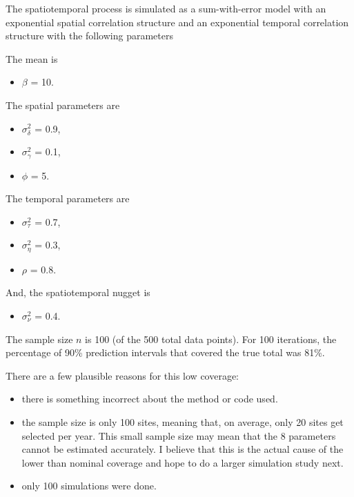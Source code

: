 \documentclass[]{interact}
\theoremstyle{plain}%
\theoremstyle{definition}
\theoremstyle{remark}
\def\tightlist{}
\begin{document}
The spatiotemporal process is simulated as a sum-with-error model with
an exponential spatial correlation structure and an exponential temporal
correlation structure with the following parameters

The mean is

\begin{itemize}
\tightlist
\item
  \(\beta\) = 10.
\end{itemize}

The spatial parameters are

\begin{itemize}
\tightlist
\item
  \(\sigma^2_{\delta}\) = 0.9,
\item
  \(\sigma^2_{\gamma}\) = 0.1,
\item
  \(\phi\) = 5.
\end{itemize}

The temporal parameters are

\begin{itemize}
\tightlist
\item
  \(\sigma^2_{\tau}\) = 0.7,
\item
  \(\sigma^2_{\eta}\) = 0.3,
\item
  \(\rho\) = 0.8.
\end{itemize}

And, the spatiotemporal nugget is

\begin{itemize}
\tightlist
\item
  \(\sigma^2_{\nu}\) = 0.4.
\end{itemize}

The sample size \(n\) is 100 (of the 500 total data points). For 100
iterations, the percentage of 90\% prediction intervals that covered the
true total was 81\%.

There are a few plausible reasons for this low coverage:

\begin{itemize}
\tightlist
\item
  there is something incorrect about the method or code used.
\item
  the sample size is only 100 sites, meaning that, on average, only 20
  sites get selected per year. This small sample size may mean that the
  8 parameters cannot be estimated accurately. I believe that this is
  the actual cause of the lower than nominal coverage and hope to do a
  larger simulation study next.
\item
  only 100 simulations were done.
\end{itemize}
\end{document}
